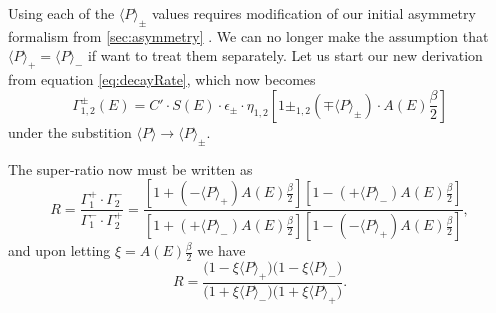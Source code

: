 Using each of the $\langle P\rangle_\pm$ values requires modification of our initial
asymmetry formalism from \ref{sec:asymmetry} \cite{ARYoungPol}. We can no longer make
the assumption that $\langle P\rangle_+ = \langle P\rangle_-$ if want to treat them
separately. Let us start our new derivation from equation \ref{eq:decayRate}, which now
becomes
%
\begin{equation} \label{eq:POLdecayRate}
  \Gamma_{1,2}^{\pm}\left(E\right)=C' \cdot S(E) \cdot \epsilon_{\pm} \cdot \eta_{1,2}
  \left[ 1 \pm_{1,2} 
    \left(\mp \langle P \rangle_\pm \right) \cdot A(E) \frac{\beta}{2} \right]
\end{equation}
%
\noindent under the substition $\langle P\rangle \rightarrow \langle P\rangle_\pm$.

The super-ratio now must be written as
%
\begin{equation*}
  R = \frac{\Gamma_{1}^+ \cdot \Gamma_{2}^-}{\Gamma_{1}^- \cdot \Gamma_{2}^+} 
  =  \frac{ \left[ 1 + \left(- \langle P \rangle_+ \right)  A(E) \frac{\beta}{2} \right] 
\left[ 1 - \left(+ \langle P \rangle_- \right)  A(E) \frac{\beta}{2} \right]  }
{  \left[ 1 +  \left(+ \langle P \rangle_- \right)  A(E) \frac{\beta}{2}  \right] 
 \left[ 1 -  \left(- \langle P \rangle_+ \right)  A(E) \frac{\beta}{2} \right]},
\end{equation*}
%
\noindent and upon letting $\xi = A(E)\frac{\beta}{2}$ we have
%
\begin{equation} \label{eq:polR}
  R =  \frac{ \Big( 1 - \xi \langle P \rangle_+ \Big)
    \Big( 1 - \xi \langle P \rangle_- \Big) }
{  \Big( 1 + \xi \langle P \rangle_- \Big)
    \Big( 1 + \xi \langle P \rangle_+ \Big) }.
\end{equation}


